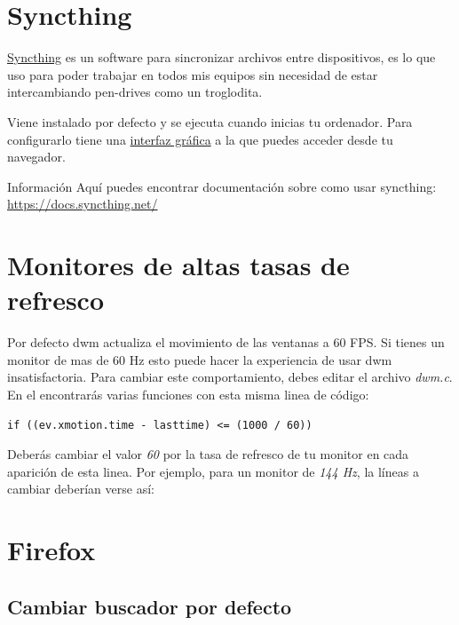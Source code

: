 \documentclass[11pt]{article}
\begin{document}
\section{Syncthing}

\href{https://github.com/syncthing/syncthing}{Syncthing} es un software para sincronizar archivos entre dispositivos, es lo que uso para poder trabajar en todos mis equipos sin necesidad de estar intercambiando pen-drives como un troglodita.

Viene instalado por defecto y se ejecuta cuando inicias tu ordenador. Para configurarlo tiene una \href{http://localhost:8384/}{interfaz gráfica} a la que puedes acceder desde tu navegador.

\begin{mybox}{Información}
Aquí puedes encontrar documentación sobre como usar syncthing: \href{https://docs.syncthing.net/}{https://docs.syncthing.net/}
\end{mybox}

\section{Monitores de altas tasas de refresco}

Por defecto dwm actualiza el movimiento de las ventanas a 60 FPS. Si tienes un monitor de mas de 60 Hz esto puede hacer la experiencia de usar dwm insatisfactoria. Para cambiar este comportamiento, debes editar el archivo \textit{dwm.c}. En el encontrarás varias funciones con esta misma linea de código:

\begin{verbatim}
if ((ev.xmotion.time - lasttime) <= (1000 / 60))
\end{verbatim}

Deberás cambiar el valor \textit{60} por la tasa de refresco de tu monitor en cada aparición de esta linea. Por ejemplo, para un monitor de \textit{144 Hz}, la líneas a cambiar deberían verse así: 

\section{Firefox}

\subsection{Cambiar buscador por defecto}

\vspace{-15pt}
\end{document}
